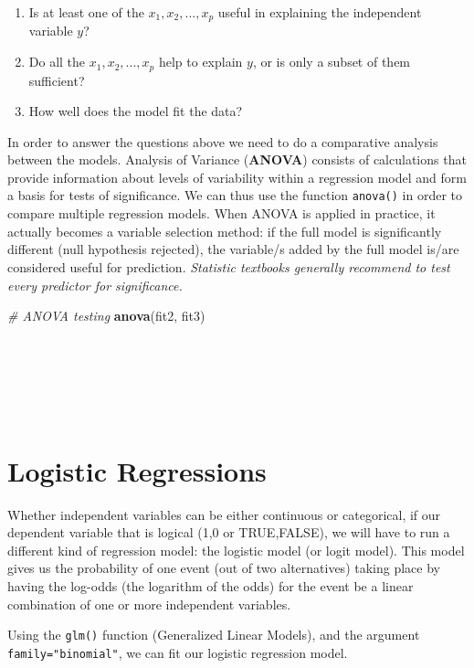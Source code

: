 \documentclass[
]{svmono}
\newenvironment{Shaded}{\begin{snugshade}}{\end{snugshade}}
\newcommand{\CommentTok}[1]{\textcolor[rgb]{0.56,0.35,0.01}{\textit{#1}}}
\newcommand{\FunctionTok}[1]{\textcolor[rgb]{0.13,0.29,0.53}{\textbf{#1}}}
\newcommand{\NormalTok}[1]{#1}
\begin{document}
\begin{enumerate}
\def\labelenumi{\arabic{enumi}.}
\item
  Is at least one of the \(x_1, x_2, . . . ,x_p\) useful in explaining
  the independent variable \(y\)?
\item
  Do all the \(x_1, x_2, . . . ,x_p\) help to explain \(y\), or is only a
  subset of them sufficient?
\item
  How well does the model fit the data?
\end{enumerate}

In order to answer the questions above we need to do a comparative
analysis between the models. Analysis of Variance (\textbf{ANOVA}) consists
of calculations that provide information about levels of variability
within a regression model and form a basis for tests of significance. We
can thus use the function \texttt{anova()} in order to compare multiple
regression models. When ANOVA is applied in practice, it actually
becomes a variable selection method: if the full model is significantly
different (null hypothesis rejected), the variable/s added by the full
model is/are considered useful for prediction. \emph{Statistic textbooks
generally recommend to test every predictor for significance.}

\begin{Shaded}
\begin{Highlighting}[]
\CommentTok{\# ANOVA testing}
\FunctionTok{anova}\NormalTok{(fit2, fit3)}
\end{Highlighting}
\end{Shaded}

~

~

~

\hypertarget{logistic-regressions}{%
\section{Logistic Regressions}\label{logistic-regressions}}

Whether independent variables can be either continuous or categorical,
if our dependent variable that is logical (1,0 or TRUE,FALSE), we will
have to run a different kind of regression model: the logistic model (or
logit model). This model gives us the probability of one event (out of
two alternatives) taking place by having the log-odds (the logarithm of
the odds) for the event be a linear combination of one or more
independent variables.

Using the \texttt{glm()} function (Generalized Linear Models), and the argument
\texttt{family="binomial"}, we can fit our logistic regression model.
\end{document}

